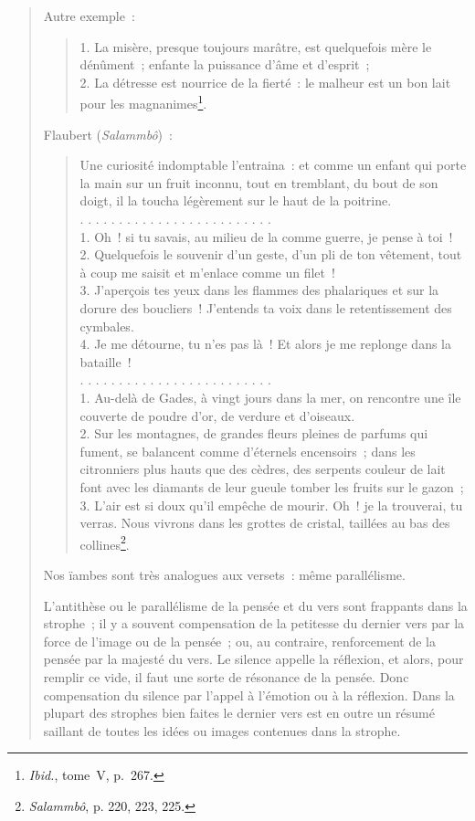 \documentclass[french,twoside]{book} %
\begin{document}
\begin{verse}
\noindent Autre exemple :\par


\begin{verse}
1. La misère, presque toujours marâtre, est quelquefois mère le dénûment ; enfante la puissance d’âme et d’esprit ;\\
2. La détresse est nourrice de la fierté : le malheur est un bon lait pour les magnanimes\footnote{\emph{Ibid.}, tome V, p. 267.}.\\
\end{verse}

\noindent Flaubert (\emph{Salammbô}) :\par


\begin{verse}
Une curiosité indomptable l’entraina : et comme un enfant qui porte la main sur un fruit inconnu, tout en tremblant, du bout de son doigt, il la toucha légèrement sur le haut de la poitrine.\\
. . . . . . . . . . . . . . . . . . . . . . . . .\\
1. Oh ! si tu savais, au milieu de la comme guerre, je pense à toi !\\
2. Quelquefois le souvenir d’un geste, d’un pli de ton vêtement, tout à coup me saisit et m’enlace comme un filet !\\
3. J’aperçois tes yeux dans les flammes des phalariques et sur la dorure des boucliers ! J’entends ta voix dans le retentissement des cymbales.\\
4. Je me détourne, tu n’es pas là ! Et alors je me replonge dans la bataille !\\
. . . . . . . . . . . . . . . . . . . . . . . . .\\
1. Au-delà de Gades, à vingt jours dans la mer, on rencontre une île couverte de poudre d’or, de verdure et d’oiseaux.\\
2. Sur les montagnes, de grandes fleurs pleines de parfums qui fument, se balancent comme d’éternels encensoirs ; dans les citronniers plus hauts que des cèdres, des serpents couleur de lait font avec les diamants de leur gueule tomber les fruits sur le gazon ;\\
3. L’air est si doux qu’il empêche de mourir. Oh ! je la trouverai, tu verras. Nous vivrons dans les grottes de cristal, taillées au bas des collines\footnote{\emph{Salammbô}, p. 220, 223, 225.}.\\
\end{verse}

\noindent Nos ïambes sont très analogues aux versets : même parallélisme.\par
L’antithèse ou le parallélisme de la pensée et du vers sont frappants dans la strophe ; il y a souvent compensation de la petitesse du dernier vers par la force de l’image ou de la pensée ; ou, au contraire, renforcement de la pensée par la majesté du vers. Le silence appelle la réflexion, et alors, pour remplir ce vide, il faut une sorte de résonance de la pensée. Donc compensation du silence par l’appel à l’émotion ou à la réflexion. Dans la plupart des strophes bien faites le dernier vers est en outre un résumé saillant de toutes les idées ou images contenues dans la strophe.\par



\end{verse}
\end{document}
